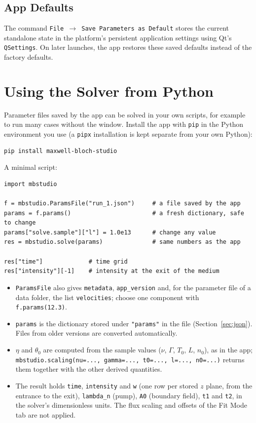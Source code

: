\documentclass[12pt,a4paper]{article}
\newcommand{\menu}[1]{\texttt{#1}}
\begin{document}
\subsection{App Defaults}

The command \menu{File $\to$ Save Parameters as Default} stores the current standalone state in the platform's
persistent application settings using Qt's \texttt{QSettings}. On later launches, the app restores these saved defaults
instead of the factory defaults.

\section{Using the Solver from Python}\label{sec:python}

Parameter files saved by the app can be solved in your own scripts, for example
to run many cases without the window. Install the app with \texttt{pip} in the
Python environment you use (a \texttt{pipx} installation is kept separate from
your own Python):
\begin{verbatim}
pip install maxwell-bloch-studio
\end{verbatim}

A minimal script:
\begin{verbatim}
import mbstudio

f = mbstudio.ParamsFile("run_1.json")     # a file saved by the app
params = f.params()                       # a fresh dictionary, safe to change
params["solve.sample"]["l"] = 1.0e13      # change any value
res = mbstudio.solve(params)              # same numbers as the app

res["time"]             # time grid
res["intensity"][-1]    # intensity at the exit of the medium
\end{verbatim}

\begin{itemize}[noitemsep]
  \item \texttt{ParamsFile} also gives \texttt{metadata}, \texttt{app\_version} and, for the
  parameter file of a data folder, the list \texttt{velocities}; choose one component
  with \texttt{f.params(12.3)}.
  \item \texttt{params} is the dictionary stored under \texttt{"params"} in the file
  (Section~\ref{sec:json}). Files from older versions are converted automatically.
  \item $\eta$ and $\theta_0$ are computed from the sample values
  ($\nu$, $\Gamma$, $T_0$, $L$, $n_0$), as in the app;
  \texttt{mbstudio.scaling(nu=..., gamma=..., t0=..., l=..., n0=...)} returns them
  together with the other derived quantities.
  \item The result holds \texttt{time}, \texttt{intensity} and \texttt{w} (one row per
  stored $z$ plane, from the entrance to the exit), \texttt{lambda\_n} (pump),
  \texttt{A0} (boundary field), \texttt{t1} and \texttt{t2}, in the solver's dimensionless
  units. The flux scaling and offsets of the Fit Mode tab are not applied.
\end{itemize}
\end{document}
